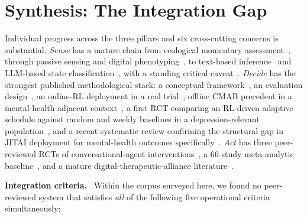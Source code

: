 \documentclass[10pt,conference]{article}
\renewcommand{\paragraph}[1]{\smallskip\par\noindent\textbf{#1}~\ignorespaces}
\begin{document}
\section{Synthesis: The Integration Gap}\label{sec:gap}

Individual progress across the three pillars and six cross-cutting
concerns is substantial. \emph{Sense} has a mature chain from
ecological momentary assessment~\cite{Trull2009ESMEMA,Versluis2016EMI},
through passive sensing and digital
phenotyping~\cite{Cornet2018PassiveSensing,Sequeira2021PassiveSensing,Insel2018DigitalPhenotyping,Wang2014StudentLife,Wang2020COVIDStudentLife},
to text-based inference~\cite{Boettcher2021RedditMHReview,Walker2024InstagramSuicideLIWC}
and LLM-based state
classification~\cite{Xu2024MentalLLM,Stade2024LLMOppRisks}, with a
standing critical
caveat~\cite{BirkSamuel2020DigitalPhenotypingCritique}. \emph{Decide}
has the strongest published methodological stack: a conceptual
framework~\cite{NahumShani2018JITAI}, an evaluation
design~\cite{Klasnja2015MRT,Liao2016MRTSampleSize,Luers2018StandardizedEffect,Seewald2019MRTData},
an online-RL deployment in a real
trial~\cite{Liao2020PersonalizedHeartSteps,Klasnja2018HeartStepsMRT},
offline CMAB precedent in a mental-health-adjacent
context~\cite{Ameko2020CMABEmotion}, a first RCT comparing an
RL-driven adaptive schedule against random and weekly baselines in a
depression-relevant population~\cite{Aguilera2024DIAMANTERL}, and a
recent systematic review confirming the structural gap in JITAI
deployment for mental-health outcomes
specifically~\cite{NahumShani2025JITAIMHReview}. \emph{Act} has three
peer-reviewed RCTs of conversational-agent
interventions~\cite{Fitzpatrick2017Woebot,Inkster2018Wysa,Heinz2025TherabotRCT},
a 66-study meta-analytic baseline~\cite{Linardon2019Meta}, and a
mature digital-therapeutic-alliance
literature~\cite{Henson2019DTA,Lederman2021DTASpecialIssue,MalouinLachance2025DTAReview}.

\paragraph{Integration criteria.}
Within the corpus surveyed here, we found no peer-reviewed system that
satisfies \emph{all} of the following five operational criteria
simultaneously:
\end{document}
